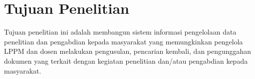 
		


\section{Tujuan Penelitian}

Tujuan penelitian ini adalah membangun sistem informasi pengelolaan data penelitian dan pengabdian 
kepada masyarakat yang memungkinkan pengelola LPPM dan dosen melakukan pengusulan, pencarian 
kembali, dan pengunggahan dokumen yang terkait dengan kegiatan penelitian dan/atau pengabdian
kepada masyarakat.

